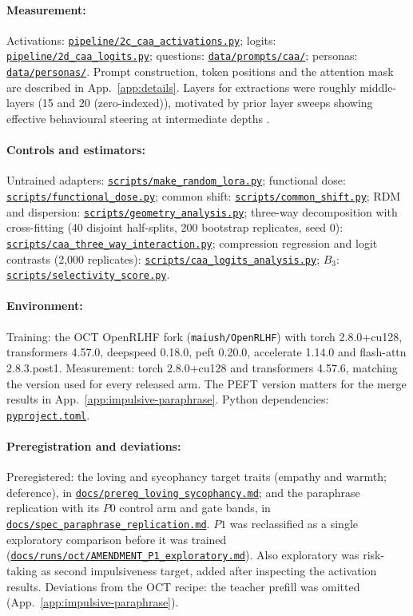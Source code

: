\documentclass[11pt]{article}
\newcommand{\provbase}{https://anonymous.4open.science/r/steering_across_personas-8046/}
\DeclareRobustCommand{\provlink}[1]{\href{\provbase/#1}{\nolinkurl{#1}}}
\begin{document}
\paragraph{Measurement:}
Activations: \provlink{pipeline/2c_caa_activations.py}; logits: \provlink{pipeline/2d_caa_logits.py}; questions: \provlink{data/prompts/caa/}; personas: \provlink{data/personas/}. Prompt construction, token positions and the attention mask are described in App.~\ref{app:details}. Layers for extractions were roughly middle-layers (15 and 20 (zero-indexed)), motivated by prior layer sweeps showing effective behavioural steering at intermediate depths \citep{rimsky2024steering,chen2025persona}.

\paragraph{Controls and estimators:}
Untrained adapters: \provlink{scripts/make_random_lora.py}; functional dose: \provlink{scripts/functional_dose.py}; common shift: \provlink{scripts/common_shift.py}; RDM and dispersion: \provlink{scripts/geometry_analysis.py}; three-way decomposition with cross-fitting (40 disjoint half-splits, 200 bootstrap replicates, seed 0): \provlink{scripts/caa_three_way_interaction.py}; compression regression and logit contrasts (2,000 replicates): \provlink{scripts/caa_logits_analysis.py}; $B_3$: \provlink{scripts/selectivity_score.py}.

\paragraph{Environment:}
Training: the OCT OpenRLHF fork (\texttt{maiush/OpenRLHF}) with torch 2.8.0+cu128, transformers 4.57.0, deepspeed 0.18.0, peft 0.20.0, accelerate 1.14.0 and flash-attn 2.8.3.post1. Measurement: torch 2.8.0+cu128 and transformers 4.57.6, matching the version used for every released arm. The PEFT version matters for the merge results in App.~\ref{app:impulsive-paraphrase}. Python dependencies: \provlink{pyproject.toml}.

\paragraph{Preregistration and deviations:}
Preregistered: the loving and sycophancy target traits (empathy and warmth; deference), in \provlink{docs/prereg_loving_sycophancy.md}; and the paraphrase replication with its $P0$ control arm and gate bands, in \provlink{docs/spec_paraphrase_replication.md}. $P1$ was reclassified as a single exploratory comparison before it was trained (\provlink{docs/runs/oct/AMENDMENT_P1_exploratory.md}). Also exploratory was risk-taking as second impulsiveness target, added after inspecting the activation results. Deviations from the OCT recipe: the teacher prefill was omitted (App.~\ref{app:impulsive-paraphrase}).
\end{document}
